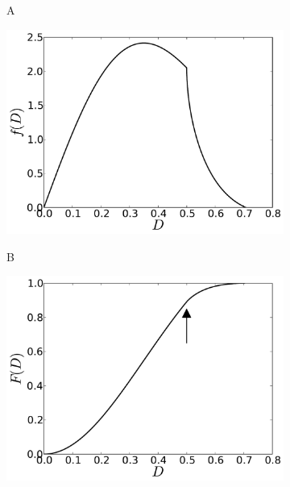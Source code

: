 \begin{figure}[ht]
\centering
\begin{subfigure}[b]{0.49\textwidth}
	  \begin{flushleft}
	  \large A
		\end{flushleft}
    \centering
    \includegraphics[width=\textwidth]{Gaussian1_PDF.pdf}
    \label{subfig:gaussian_PDF}
\end{subfigure}
\begin{subfigure}[b]{0.49\textwidth}
	  \begin{flushleft}
	  \large B
		\end{flushleft}
    \centering
    \includegraphics[width=\textwidth]{Gaussian1_CDF.pdf}
    \label{subfig:gaussian_CDF}

\end{subfigure}
\end{figure}
